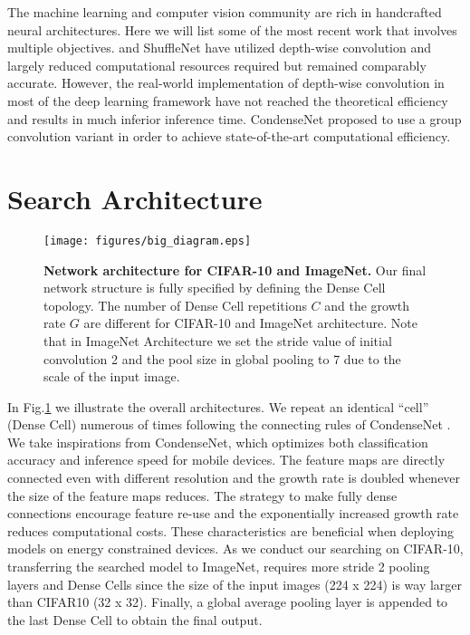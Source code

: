 \documentclass[runningheads]{llncs}
\begin{document}
The machine learning and computer vision community are rich in handcrafted neural architectures. Here we will list some of the most recent work that involves multiple objectives. \cite{howard2017mobilenets} and ShuffleNet \cite{zhang2017shufflenet} have utilized depth-wise convolution and largely reduced computational resources required but remained comparably accurate. However, the real-world implementation of depth-wise convolution in most of the deep learning framework have not reached the theoretical efficiency and results in much inferior inference time. CondenseNet \cite{huang2017condensenet} proposed to use a group convolution \cite{krizhevsky2012imagenet} variant in order to achieve state-of-the-art computational efficiency.
\section{Search Architecture}\begin{figure}[h]
\centering     %
\texttt{[image: figures/big\_diagram.eps]}
\caption{\textbf{Network architecture for CIFAR-10 and ImageNet.}
Our final network structure is fully specified by defining the Dense Cell topology. The number of Dense Cell repetitions $C$ and the growth rate $G$ are different for CIFAR-10 and ImageNet architecture. Note that in ImageNet Architecture we set the stride value of initial convolution 2 and the pool size in global pooling to 7 due to the scale of the input image.}
\label{fig.bigdiagram}
\end{figure}

In Fig.\ref{fig.bigdiagram} we illustrate the overall architectures. We repeat an identical ``cell'' (Dense Cell) numerous of times following the connecting rules of CondenseNet \cite{huang2017condensenet}. We take inspirations from CondenseNet, which optimizes both classification accuracy and inference speed for mobile devices. The feature maps are directly connected even with different resolution and the growth rate is doubled whenever the size of the feature maps reduces. The strategy to make fully dense connections encourage feature re-use and the exponentially increased growth rate reduces computational costs. These characteristics are beneficial when deploying models on energy constrained devices. As we conduct our searching on CIFAR-10, transferring the searched model to ImageNet, requires more stride 2 pooling layers and Dense Cells since the size of the input images (224 x 224) is way larger than CIFAR10 (32 x 32). Finally, a global average pooling layer is appended to the last Dense Cell to obtain the final output.
\end{document}
